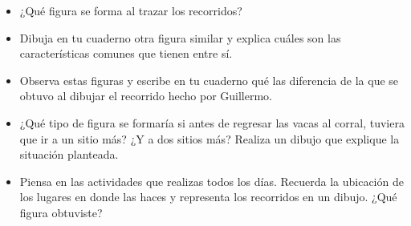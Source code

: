 \documentclass[letterpaper,11pt,twoside]{article}
\begin{document}
\begin{multicols}{2}
\begin{itemize}
\item ¿Qué figura se forma al trazar los recorridos?
\item Dibuja en tu cuaderno otra figura similar y explica
cuáles son las características comunes que tienen
entre sí.
\item Observa estas figuras y escribe en tu cuaderno qué las
diferencia de la que se obtuvo al dibujar el recorrido
hecho por Guillermo.
\end{itemize}
\begin{center}
\end{center}
\begin{itemize}
\item ¿Qué tipo de figura se formaría si antes de regresar las
vacas al corral, tuviera que ir a un sitio más? ¿Y a dos
sitios más? Realiza un dibujo que explique la situación
planteada.
\item Piensa en las actividades que realizas todos los días.
Recuerda la ubicación de los lugares en donde las haces
y representa los recorridos en un dibujo. ¿Qué figura
obtuviste?
\end{itemize}

\end{multicols}
\end{document}
